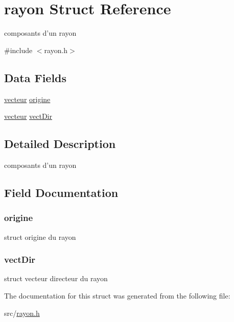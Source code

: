 \hypertarget{structrayon}{
\section{rayon Struct Reference}
\label{structrayon}
}


composants d'un rayon  




{\ttfamily \#include $<$rayon.h$>$}

\subsection*{Data Fields}
\begin{DoxyCompactItemize}
\item 
\hyperlink{structvecteur}{vecteur} \hyperlink{structrayon_aca9dcf4a9ee74d058bada3b340f4a829}{origine}
\item 
\hyperlink{structvecteur}{vecteur} \hyperlink{structrayon_a9528572e6df2141a5724d8197232eef4}{vectDir}
\end{DoxyCompactItemize}


\subsection{Detailed Description}
composants d'un rayon 

\subsection{Field Documentation}
\hypertarget{structrayon_aca9dcf4a9ee74d058bada3b340f4a829}{
\subsubsection[{origine}]{ {\bf origine}}}
\label{structrayon_aca9dcf4a9ee74d058bada3b340f4a829}
struct origine du rayon \hypertarget{structrayon_a9528572e6df2141a5724d8197232eef4}{
\subsubsection[{vectDir}]{ {\bf vectDir}}}
\label{structrayon_a9528572e6df2141a5724d8197232eef4}
struct vecteur directeur du rayon 

The documentation for this struct was generated from the following file:\begin{DoxyCompactItemize}
\item 
src/\hyperlink{rayon_8h}{rayon.h}\end{DoxyCompactItemize}

